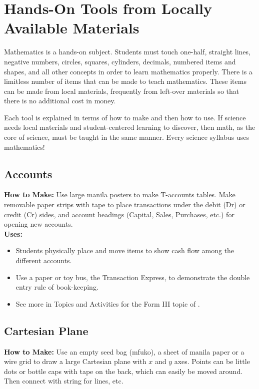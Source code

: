 \chapter{Hands-On Tools from Locally Available Materials} 

Mathematics is a hands-on subject. Students must touch one-half, straight lines, negative numbers, circles, squares, cylinders, decimals, numbered items and shapes, and all other concepts in order to learn mathematics properly. There is a limitless number of items that can be made to teach mathematics. These items can be made from local materials, frequently from left-over materials so that there is no additional cost in money.

Each tool is explained in terms of how to make and then how to use. If science needs local materials and student-centered learning to discover, then math, as the core of science, must be taught in the same manner. Every science syllabus uses mathematics!

\section{Accounts} \label{accountstools}
\textbf{How to Make:} Use large manila posters to make T-accounts tables. Make removable paper strips with tape to place transactions under the debit (Dr) or credit (Cr) sides, and account headings (Capital, Sales, Purchases, etc.) for opening new accounts.\\

\noindent\textbf{Uses:}
\begin{itemize}
\item Students physically place and move items to show cash flow among the different accounts.
\item Use a paper or toy bus, the Transaction Express, to demonstrate the double entry rule of book-keeping.
\item See more in Topics and Activities for the Form III topic of .
\end{itemize}

\section{Cartesian Plane} \label{cartesianplane}
\textbf{How to Make:} Use an empty seed bag (mfuko), a sheet of manila paper or a wire grid to draw a large Cartesian plane with $x$ and $y$ axes. Points can be little dots or bottle caps with tape on the back, which can easily be moved around. Then connect with string for lines, etc.\\

